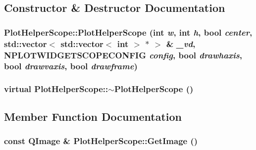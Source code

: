 \subsection{Constructor \& Destructor Documentation}
\hypertarget{class_plot_helper_scope_3c1b1aced962c1d2b82f1252253cfaed}{
\subsubsection[{PlotHelperScope}]{\setlength{\rightskip}{0pt plus 5cm}PlotHelperScope::PlotHelperScope (int {\em w}, \/  int {\em h}, \/  bool {\em center}, \/  std::vector$<$ std::vector$<$ int $>$ $\ast$ $>$ \& {\em \_\-vd}, \/  NPLOTWIDGETSCOPECONFIG {\em config}, \/  bool {\em drawhaxis}, \/  bool {\em drawvaxis}, \/  bool {\em drawframe})}}
\label{class_plot_helper_scope_3c1b1aced962c1d2b82f1252253cfaed}


\hypertarget{class_plot_helper_scope_389451e3cc5caf2bc93c11089968b131}{
\subsubsection[{$\sim$PlotHelperScope}]{\setlength{\rightskip}{0pt plus 5cm}virtual PlotHelperScope::$\sim$PlotHelperScope ()}}
\label{class_plot_helper_scope_389451e3cc5caf2bc93c11089968b131}




\subsection{Member Function Documentation}
\hypertarget{class_plot_helper_scope_14f9dd65241014d966dfade9ce51ade3}{
\subsubsection[{GetImage}]{\setlength{\rightskip}{0pt plus 5cm}const QImage \& PlotHelperScope::GetImage ()}}
\label{class_plot_helper_scope_14f9dd65241014d966dfade9ce51ade3}




